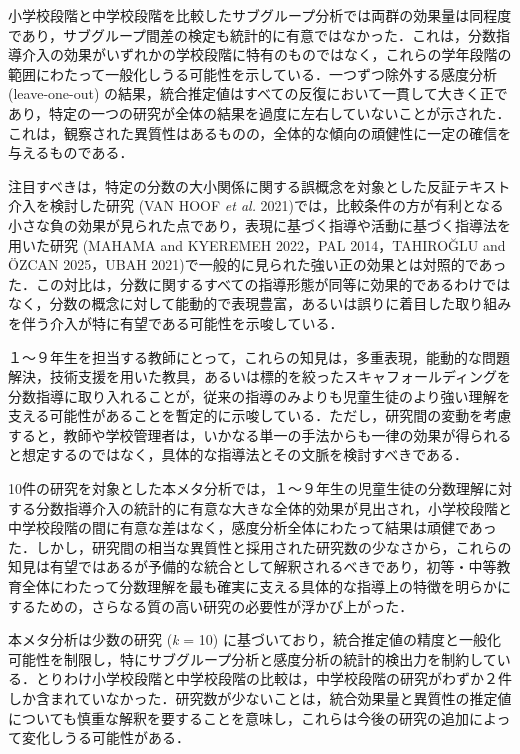 \documentclass[
  lualatex, ja=standard, paper={182mm,257mm}, twocolumn, fontsize=8.5pt, baselineskip=13.5pt,
  line_length=24zw, column_gap=6.1mm, number_of_lines=45, head_space=24.5mm, gutter=16.25mm
]{jlreq}
\newcommand{\chap}[2]{\par\vspace{13.5pt}\needspace{4\baselineskip}{\centering\gtfamily\bfseries #1．#2\par}\nopagebreak}
\begin{document}
小学校段階と中学校段階を比較したサブグループ分析では両群の効果量は同程度であり，サブグループ間差の検定も統計的に有意ではなかった．これは，分数指導介入の効果がいずれかの学校段階に特有のものではなく，これらの学年段階の範囲にわたって一般化しうる可能性を示している．一つずつ除外する感度分析 (leave-one-out) の結果，統合推定値はすべての反復において一貫して大きく正であり，特定の一つの研究が全体の結果を過度に左右していないことが示された．これは，観察された異質性はあるものの，全体的な傾向の頑健性に一定の確信を与えるものである．

注目すべきは，特定の分数の大小関係に関する誤概念を対象とした反証テキスト介入を検討した研究 (VAN HOOF \textit{et al.} 2021)では，比較条件の方が有利となる小さな負の効果が見られた点であり，表現に基づく指導や活動に基づく指導法を用いた研究 (MAHAMA and KYEREMEH 2022，PAL 2014，TAHIROĞLU and ÖZCAN 2025，UBAH 2021)で一般的に見られた強い正の効果とは対照的であった．この対比は，分数に関するすべての指導形態が同等に効果的であるわけではなく，分数の概念に対して能動的で表現豊富，あるいは誤りに着目した取り組みを伴う介入が特に有望である可能性を示唆している．

１〜９年生を担当する教師にとって，これらの知見は，多重表現，能動的な問題解決，技術支援を用いた教具，あるいは標的を絞ったスキャフォールディングを分数指導に取り入れることが，従来の指導のみよりも児童生徒のより強い理解を支える可能性があることを暫定的に示唆している．ただし，研究間の変動を考慮すると，教師や学校管理者は，いかなる単一の手法からも一律の効果が得られると想定するのではなく，具体的な指導法とその文脈を検討すべきである．

\chap{5}{まとめ}
10件の研究を対象とした本メタ分析では，１〜９年生の児童生徒の分数理解に対する分数指導介入の統計的に有意な大きな全体的効果が見出され，小学校段階と中学校段階の間に有意な差はなく，感度分析全体にわたって結果は頑健であった．しかし，研究間の相当な異質性と採用された研究数の少なさから，これらの知見は有望ではあるが予備的な統合として解釈されるべきであり，初等・中等教育全体にわたって分数理解を最も確実に支える具体的な指導上の特徴を明らかにするための，さらなる質の高い研究の必要性が浮かび上がった．

本メタ分析は少数の研究 (\textit{k} = 10) に基づいており，統合推定値の精度と一般化可能性を制限し，特にサブグループ分析と感度分析の統計的検出力を制約している．とりわけ小学校段階と中学校段階の比較は，中学校段階の研究がわずか２件しか含まれていなかった．研究数が少ないことは，統合効果量と異質性の推定値についても慎重な解釈を要することを意味し，これらは今後の研究の追加によって変化しうる可能性がある．
\end{document}
